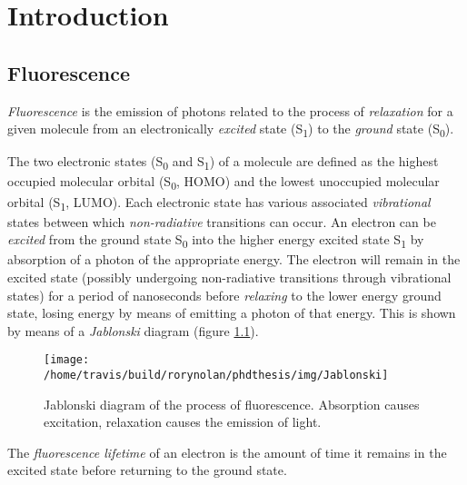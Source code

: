 \documentclass[12pt,]{book}
\theoremstyle{definition}
\theoremstyle{definition}
\theoremstyle{definition}
\theoremstyle{remark}
\let\BeginKnitrBlock\begin \let\EndKnitrBlock\end
\begin{document}
\chapter{Introduction}\label{intro}

\section{Fluorescence}\label{fluorescence}

\BeginKnitrBlock{definition}
\protect\hypertarget{def:unnamed-chunk-1}{}{\label{def:unnamed-chunk-1}
}\emph{Fluorescence} is the emission of photons related to the process
of \emph{relaxation} for a given molecule from an electronically
\emph{excited} state (S\textsubscript{1}) to the \emph{ground} state
(S\textsubscript{0}).
\EndKnitrBlock{definition}

The two electronic states (S\textsubscript{0} and S\textsubscript{1}) of
a molecule are defined as the highest occupied molecular orbital
(S\textsubscript{0}, HOMO) and the lowest unoccupied molecular orbital
(S\textsubscript{1}, LUMO). Each electronic state has various associated
\emph{vibrational} states between which \emph{non-radiative} transitions
can occur. An electron can be \emph{excited} from the ground state
S\textsubscript{0} into the higher energy excited state
S\textsubscript{1} by absorption of a photon of the appropriate energy.
The electron will remain in the excited state (possibly undergoing
non-radiative transitions through vibrational states) for a period of
nanoseconds before \emph{relaxing} to the lower energy ground state,
losing energy by means of emitting a photon of that energy. This is
shown by means of a \emph{Jablonski} diagram (figure
\ref{fig:Jablonski}).





\begin{figure}

\texttt{[image: /home/travis/build/rorynolan/phdthesis/img/Jablonski]} \hfill{}

\caption{Jablonski diagram of the process of
fluorescence. Absorption causes excitation, relaxation causes the
emission of light.}\label{fig:Jablonski}
\end{figure}

\BeginKnitrBlock{definition}
\protect\hypertarget{def:unnamed-chunk-2}{}{\label{def:unnamed-chunk-2} }The
\emph{fluorescence lifetime} of an electron is the amount of time it
remains in the excited state before returning to the ground state.
\EndKnitrBlock{definition}
\end{document}
